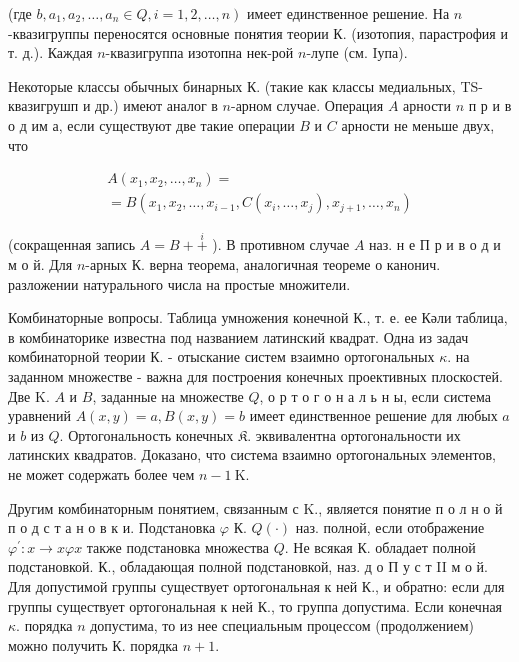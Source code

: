 \documentclass[10pt]{article}
\begin{document}
(где $\left.b, a_{1}, a_{2}, \ldots, a_{n} \in Q, i=1,2, \ldots, n\right)$ имеет единственное решение. На $n$-квазигруппы переносятся основные понятия теории К. (изотопия, парастрофия и т. д.). Каждая $n$-квазигруппа изотопна нек-рой $n$-лупе (см. Iупа).



Некоторые классы обычных бинарных К. (такие как классы медиальных, TS-квазигрушп и др.) имеют аналог в $n$-арном случае. Операция $A$ арности $n$ п р и в о д им а, если существуют две такие операции $B$ и $C$ арности не меньше двух, что



\[

\begin{gathered}

A\left(x_{1}, x_{2}, \ldots, x_{n}\right)= \\

=B\left(x_{1}, x_{2}, \ldots, x_{i-1}, C\left(x_{i}, \ldots, x_{j}\right), x_{j+1}, \ldots, x_{n}\right)

\end{gathered}

\]



(сокращенная запись $A=B+\stackrel{i}{+}$ ). В противном случае $A$ наз. н е П р и в о д и м о й. Для $n$-арных $К$. верна теорема, аналогичная теореме о канонич. разложении натурального числа на простые множители.



Комбинаторные вопросы. Таблица умножения конечной К., т. е. ее Кәли таблица, в комбинаторике известна под названием латинский квадрат. Одна из задач комбинаторной теории К. - отыскание систем взаимно ортогональных $\kappa$. на заданном множестве - важна для построения конечных проективных плоскостей. Две $\mathrm{K}$. $A$ и $B$, заданные на множестве $Q$, о р т о г о н а л ь н ы, если система уравнений $A(x, y)=a, B(x, y)=b$ имеет единственное решение для любых $a$ и $b$ из $Q$. Ортогональность конечных $\mathfrak{K}$. эквивалентна ортогональности их латинских квадратов. Доказано, что система взаимно ортогональных элементов, не может содержать более чем $n-1 \mathrm{~K}$.



Другим комбинаторным понятием, связанным с K., является понятие п о л н о й п о д с т а н о в к и. Подстановка $\varphi$ К. $Q(\cdot)$ наз. полной, если отображение $\varphi^{\prime}: x \rightarrow x \varphi x$ также подстановка множества $Q$. Не всякая К. обладает полной подстановкой. К., обладающая полной подстановкой, наз. д о П у с т II м о й. Для допустимой группы существует ортогональная к ней К., и обратно: если для группы существует ортогональная к ней К., то группа допустима. Если конечная $\kappa$. порядка $n$ допустима, то из нее специальным процессом (продолжением) можно получить К. порядка $n+1$.
\end{document}

